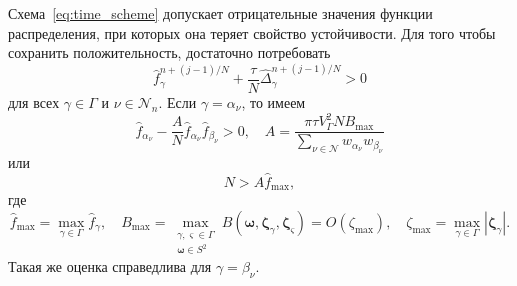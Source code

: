\documentclass[
aps,%
12pt,%
final,%
notitlepage,%
oneside,%
onecolumn,%
nobibnotes,%
nofootinbib,%
superscriptaddress,%
noshowpacs,%
showkeys,%
floatfix,%
tightenlines,%
centertags]%
{revtex4}
\newcommand{\bzeta}{\boldsymbol{\zeta}}
\newcommand{\Nu}{\mathcal{N}}
\newcommand{\OO}[1]{O(#1)}
\begin{document}
Схема~\eqref{eq:time_scheme} допускает отрицательные значения функции распределения,
при которых она теряет свойство устойчивости.
Для того чтобы сохранить положительность, достаточно потребовать
\begin{equation}\label{eq:positive_f}
    \hat{f}_\gamma^{n+(j-1)/N} + \frac{\tau}N \hat{\Delta}_\gamma^{n+(j-1)/N} > 0
\end{equation}
для всех \(\gamma\in\Gamma\) и \(\nu\in\Nu_n\).
Если \(\gamma = \alpha_\nu\), то имеем
\begin{equation}\label{eq:positive_f_alpha}
    \hat{f}_{\alpha_\nu} - \frac{A}{N}\hat{f}_{\alpha_\nu}\hat{f}_{\beta_\nu} > 0, \quad
    A = \frac{\pi\tau V_\Gamma^2 N B_{\max}}{\sum_{\nu\in\Nu} w_{\alpha_\nu}w_{\beta_\nu}}
\end{equation}
или
\begin{equation}\label{eq:positive_f_alpha2}
    N > A \hat{f}_{\max},
\end{equation}
где
\begin{equation}\label{eq:f_B_max}
    \hat{f}_{\max} = \max_{\gamma\in\Gamma} \hat{f}_\gamma, \quad
    B_{\max} = \max_{\substack{\gamma,\varsigma\in\Gamma\\\boldsymbol{\omega}\in S^2}}
        B(\boldsymbol{\omega}, \bzeta_{\gamma}, \bzeta_{\varsigma}) = \OO{\zeta_{\max}}, \quad
    \zeta_{\max} = \max_{\gamma\in\Gamma}|\bzeta_\gamma|.
\end{equation}
Такая же оценка справедлива для \(\gamma = \beta_\nu\).
\end{document}

